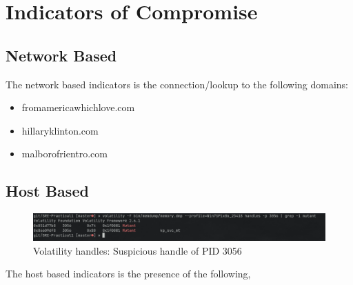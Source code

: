 \documentclass[10pt,a4paper]{article}
\begin{document}
\section{Indicators of Compromise}
			\subsection{Network Based}
				The network based indicators is the connection/lookup to the following domains:
				\begin{itemize}
					\item fromamericawhichlove.com
					\item hillaryklinton.com
					\item malborofrientro.com
				\end{itemize}
			\subsection{Host Based}
				\begin{figure}[!htbp]%
					\centering
					\includegraphics[width=\columnwidth]{pics/mutant.png}
					\caption{Volatility handles: Suspicious handle of PID 3056}
					\label{mutant}
				\end{figure}
				The host based indicators is the presence of the following,
\end{document}
